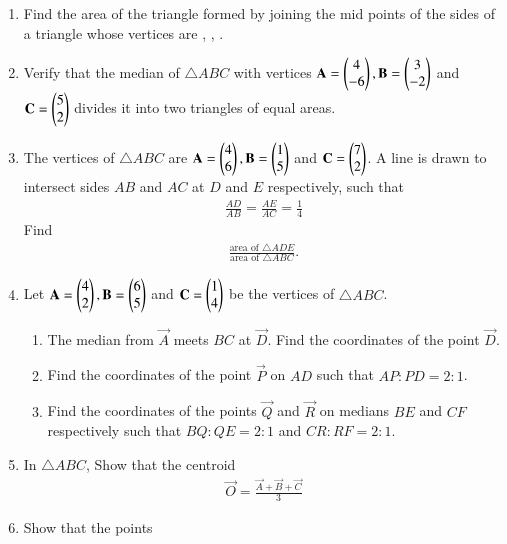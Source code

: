 \begin{enumerate}[label=\arabic*.,ref=\thesubsection.\theenumi]
\item Find the area of the triangle formed by joining the mid points of the sides of a triangle whose vertices are  ,  ,  .
\\
\solution

\item Verify that the median of $\triangle ABC$ with vertices $\mathbf{A}=\begin{pmatrix}4\\-6\end{pmatrix},  \mathbf{B}=\begin{pmatrix}3\\-2\end{pmatrix}$ and  $\mathbf{C} =  \begin{pmatrix}5\\2\end{pmatrix}$ divides it into two triangles of equal areas.
\item The vertices of $\triangle ABC$ are $\mathbf{A}=\begin{pmatrix}4\\6\end{pmatrix},  \mathbf{B}=\begin{pmatrix}1\\5\end{pmatrix}$ and  $\mathbf{C} =  \begin{pmatrix}7\\2\end{pmatrix}$.  A line is drawn to intersect sides $AB$ and $AC$ at $D$ and $E$ respectively, such that
\begin{align}
\frac{AD}{AB}=\frac{AE}{AC}= \frac{1}{4}
\end{align}
%
Find 
\begin{align}
\frac{\text{area of }\triangle ADE}{\text{area of }\triangle ABC}.
\end{align}
\item Let $\mathbf{A}=\begin{pmatrix}4\\2\end{pmatrix},  \mathbf{B}=\begin{pmatrix}6\\5\end{pmatrix}$ and  $\mathbf{C} =  \begin{pmatrix}1\\4\end{pmatrix}$ be the vertices of $\triangle ABC$.
\begin{enumerate}
\item The median from $\vec{A}$ meets $BC$ at $\vec{D}$.  Find the coordinates of the point $\vec{D}$.
\item Find the coordinates of the point $\vec{P}$ on $AD$ such that $AP:PD = 2:1$.
\item Find the coordinates of the points $\vec{Q}$ and $\vec{R}$ on medians $BE$ and $CF$ respectively such that $BQ:QE = 2:1$ and $CR:RF = 2:1$.
\end{enumerate}
\item In $\triangle ABC$, Show that the centroid 
\begin{align}
\vec{O} = \frac{\vec{A}+\vec{B}+\vec{C}}{3}
\end{align}
\item Show that the points 

\end{enumerate}
